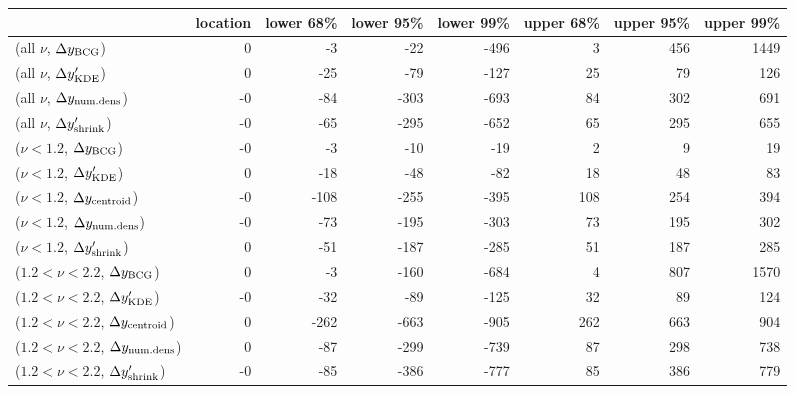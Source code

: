 \begin{tabular}{lrrrrrrr}
\toprule
{} &  location &  lower 68\% &  lower 95\% &  lower 99\% &  upper 68\% &  upper 95\% &  upper 99\% \\
\midrule
(all $\nu$, $\Delta y_{\rm BCG}$)               &         0 &          -3 &         -22 &        -496 &           3 &         456 &        1449 \\
(all $\nu$, $\Delta y_{\rm KDE}'$)              &         0 &         -25 &         -79 &        -127 &          25 &          79 &         126 \\
(all $\nu$, $\Delta y_{\rm num. dens}$)         &        -0 &         -84 &        -303 &        -693 &          84 &         302 &         691 \\
(all $\nu$, $\Delta y_{\rm shrink}'$)           &        -0 &         -65 &        -295 &        -652 &          65 &         295 &         655 \\
($\nu < 1.2$, $\Delta y_{\rm BCG}$)             &        -0 &          -3 &         -10 &         -19 &           2 &           9 &          19 \\
($\nu < 1.2$, $\Delta y_{\rm KDE}'$)            &         0 &         -18 &         -48 &         -82 &          18 &          48 &          83 \\
($\nu < 1.2$, $\Delta y_{\rm centroid}$)        &        -0 &        -108 &        -255 &        -395 &         108 &         254 &         394 \\
($\nu < 1.2$, $\Delta y_{\rm num. dens}$)       &        -0 &         -73 &        -195 &        -303 &          73 &         195 &         302 \\
($\nu < 1.2$, $\Delta y_{\rm shrink}'$)         &         0 &         -51 &        -187 &        -285 &          51 &         187 &         285 \\
($1.2 < \nu < 2.2$, $\Delta y_{\rm BCG}$)       &         0 &          -3 &        -160 &        -684 &           4 &         807 &        1570 \\
($1.2 < \nu < 2.2$, $\Delta y_{\rm KDE}'$)      &        -0 &         -32 &         -89 &        -125 &          32 &          89 &         124 \\
($1.2 < \nu < 2.2$, $\Delta y_{\rm centroid}$)  &         0 &        -262 &        -663 &        -905 &         262 &         663 &         904 \\
($1.2 < \nu < 2.2$, $\Delta y_{\rm num. dens}$) &         0 &         -87 &        -299 &        -739 &          87 &         298 &         738 \\
($1.2 < \nu < 2.2$, $\Delta y_{\rm shrink}'$)   &        -0 &         -85 &        -386 &        -777 &          85 &         386 &         779 \\
\bottomrule
\end{tabular}
